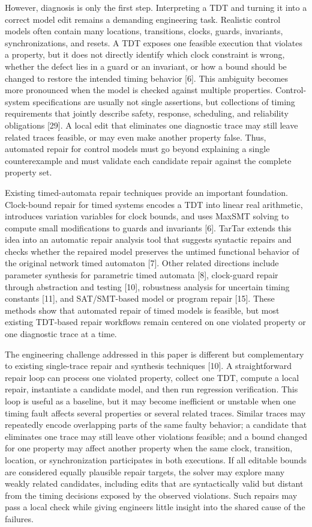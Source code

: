 \documentclass[
]{article}
\begin{document}
However, diagnosis is only the first step. Interpreting a TDT and
turning it into a correct model edit remains a demanding engineering
task. Realistic control models often contain many locations,
transitions, clocks, guards, invariants, synchronizations, and resets. A
TDT exposes one feasible execution that violates a property, but it does
not directly identify which clock constraint is wrong, whether the
defect lies in a guard or an invariant, or how a bound should be changed
to restore the intended timing behavior {[}6{]}. This ambiguity becomes
more pronounced when the model is checked against multiple properties.
Control-system specifications are usually not single assertions, but
collections of timing requirements that jointly describe safety,
response, scheduling, and reliability obligations {[}29{]}. A local edit
that eliminates one diagnostic trace may still leave related traces
feasible, or may even make another property false. Thus, automated
repair for control models must go beyond explaining a single
counterexample and must validate each candidate repair against the
complete property set.

Existing timed-automata repair techniques provide an important
foundation. Clock-bound repair for timed systems encodes a TDT into
linear real arithmetic, introduces variation variables for clock bounds,
and uses MaxSMT solving to compute small modifications to guards and
invariants {[}6{]}. TarTar extends this idea into an automatic repair
analysis tool that suggests syntactic repairs and checks whether the
repaired model preserves the untimed functional behavior of the original
network timed automaton {[}7{]}. Other related directions include
parameter synthesis for parametric timed automata {[}8{]}, clock-guard
repair through abstraction and testing {[}10{]}, robustness analysis for
uncertain timing constants {[}11{]}, and SAT/SMT-based model or program
repair {[}15{]}. These methods show that automated repair of timed
models is feasible, but most existing TDT-based repair workflows remain
centered on one violated property or one diagnostic trace at a time.

The engineering challenge addressed in this paper is different but
complementary to existing single-trace repair and synthesis techniques
{[}10{]}. A straightforward repair loop can process one violated
property, collect one TDT, compute a local repair, instantiate a
candidate model, and then run regression verification. This loop is
useful as a baseline, but it may become inefficient or unstable when one
timing fault affects several properties or several related traces.
Similar traces may repeatedly encode overlapping parts of the same
faulty behavior; a candidate that eliminates one trace may still leave
other violations feasible; and a bound changed for one property may
affect another property when the same clock, transition, location, or
synchronization participates in both executions. If all editable bounds
are considered equally plausible repair targets, the solver may explore
many weakly related candidates, including edits that are syntactically
valid but distant from the timing decisions exposed by the observed
violations. Such repairs may pass a local check while giving engineers
little insight into the shared cause of the failures.
\end{document}
